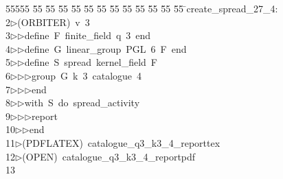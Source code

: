 %
%
\begin{tabbing}
55555 \= 55 \= 55 \= 55 \= 55 \= 55 \= 55 \= 55 \= 55 \= 55 \= 55 \= 55 \= 55 \= \>create\_spread\_27\_4:\\[0pt]
2\>$\triangleright$\>(ORBITER)\ v\ 3\ \\[0pt]
3\>$\triangleright$\>$\triangleright$\>define\ F\ finite\_field\ q\ 3\ end\ \\[0pt]
4\>$\triangleright$\>$\triangleright$\>define\ G\ linear\_group\ PGL\ 6\ F\ end\ \\[0pt]
5\>$\triangleright$\>$\triangleright$\>define\ S\ spread\ kernel\_field\ F\ \\[0pt]
6\>$\triangleright$\>$\triangleright$\>$\triangleright$\>group\ G\ k\ 3\ catalogue\ 4\ \\[0pt]
7\>$\triangleright$\>$\triangleright$\>$\triangleright$\>end\ \\[0pt]
8\>$\triangleright$\>$\triangleright$\>with\ S\ do\ spread\_activity\ \\[0pt]
9\>$\triangleright$\>$\triangleright$\>$\triangleright$\>report\ \\[0pt]
10\>$\triangleright$\>$\triangleright$\>end\\[0pt]
11\>$\triangleright$\>(PDFLATEX)\ catalogue\_q3\_k3\_4\_reporttex\\[0pt]
12\>$\triangleright$\>(OPEN)\ catalogue\_q3\_k3\_4\_reportpdf\\[0pt]
13\>\end{tabbing}
